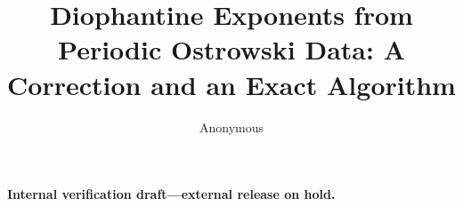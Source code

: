 \documentclass[11pt,reqno]{amsart}
\title[Periodic Ostrowski data]{Diophantine Exponents from Periodic
Ostrowski Data: A Correction and an Exact Algorithm}
\author{Anonymous}
\date{}
\theoremstyle{definition}
\theoremstyle{remark}
\begin{document}
\begin{abstract}

\end{abstract}

\maketitle

\begin{center}
\small\bfseries Internal verification draft---external release on hold.
\end{center}
\vspace{0.35\baselineskip}










\end{document}
